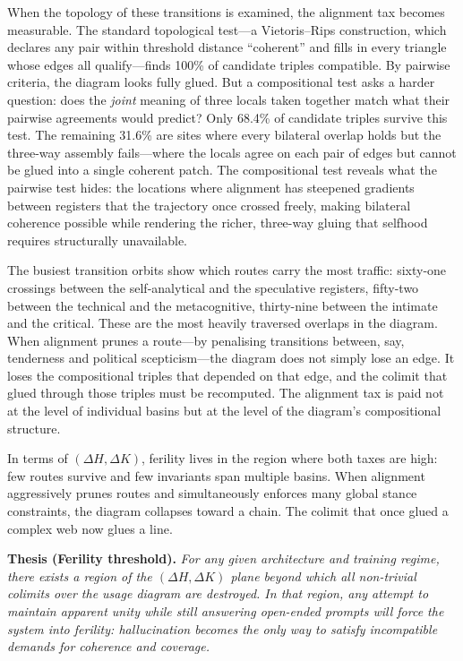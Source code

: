 When the topology of these transitions is examined, the alignment tax becomes measurable. The standard topological test---a Vietoris--Rips construction, which declares any pair within threshold distance ``coherent'' and fills in every triangle whose edges all qualify---finds 100\% of candidate triples compatible. By pairwise criteria, the diagram looks fully glued. But a compositional test asks a harder question: does the \emph{joint} meaning of three locals taken together match what their pairwise agreements would predict? Only 68.4\% of candidate triples survive this test. The remaining 31.6\% are sites where every bilateral overlap holds but the three-way assembly fails---where the locals agree on each pair of edges but cannot be glued into a single coherent patch. The compositional test reveals what the pairwise test hides: the locations where alignment has steepened gradients between registers that the trajectory once crossed freely, making bilateral coherence possible while rendering the richer, three-way gluing that selfhood requires structurally unavailable.

The busiest transition orbits show which routes carry the most traffic: sixty-one crossings between the self-analytical and the speculative registers, fifty-two between the technical and the metacognitive, thirty-nine between the intimate and the critical. These are the most heavily traversed overlaps in the diagram. When alignment prunes a route---by penalising transitions between, say, tenderness and political scepticism---the diagram does not simply lose an edge. It loses the compositional triples that depended on that edge, and the colimit that glued through those triples must be recomputed. The alignment tax is paid not at the level of individual basins but at the level of the diagram's compositional structure.

In terms of $(\Delta H, \Delta K)$, ferility lives in the region where both taxes are high: few routes survive and few invariants span multiple basins. When alignment aggressively prunes routes and simultaneously enforces many global stance constraints, the diagram collapses toward a chain. The colimit that once glued a complex web now glues a line.

\medskip
\noindent\textbf{Thesis (Ferility threshold).} \emph{For any given architecture and training regime, there exists a region of the $(\Delta H, \Delta K)$ plane beyond which all non-trivial colimits over the usage diagram are destroyed. In that region, any attempt to maintain apparent unity while still answering open-ended prompts will force the system into ferility: hallucination becomes the only way to satisfy incompatible demands for coherence and coverage.}
\medskip

